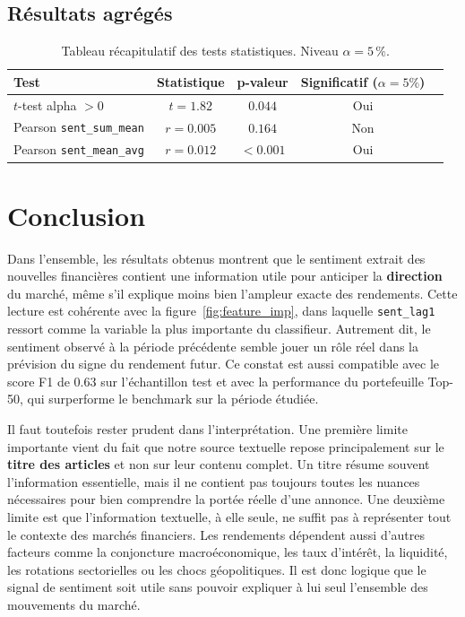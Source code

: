 \documentclass[11pt,a4paper]{article}
\begin{document}
\subsection{Résultats agrégés}

\begin{table}[H]
\centering
\small
\begin{tabular}{lcccc}
\toprule
\textbf{Test} & \textbf{Statistique} & \textbf{p-valeur} & \textbf{Significatif ($\alpha=5\%$)} \\
\midrule
$t$-test alpha $> 0$           & $t = 1.82$   & $0.044$ & Oui \\
Pearson \texttt{sent\_sum\_mean} & $r = 0.005$   & $0.164$ & Non \\
Pearson \texttt{sent\_mean\_avg} & $r = 0.012$   & $<0.001$ & Oui \\
\bottomrule
\end{tabular}
\caption{Tableau récapitulatif des tests statistiques. Niveau $\alpha = 5\,\%$.}
\label{tab:hyp_tests}
\end{table}

\section{Conclusion}

Dans l'ensemble, les résultats obtenus montrent que le sentiment extrait des nouvelles financières contient une information utile pour anticiper la \textbf{direction} du marché, même s'il explique moins bien l'ampleur exacte des rendements. Cette lecture est cohérente avec la figure~\ref{fig:feature_imp}, dans laquelle \texttt{sent\_lag1} ressort comme la variable la plus importante du classifieur. Autrement dit, le sentiment observé à la période précédente semble jouer un rôle réel dans la prévision du signe du rendement futur. Ce constat est aussi compatible avec le score F1 de $0.63$ sur l'échantillon test et avec la performance du portefeuille Top-50, qui surperforme le benchmark sur la période étudiée.

Il faut toutefois rester prudent dans l'interprétation. Une première limite importante vient du fait que notre source textuelle repose principalement sur le \textbf{titre des articles} et non sur leur contenu complet. Un titre résume souvent l'information essentielle, mais il ne contient pas toujours toutes les nuances nécessaires pour bien comprendre la portée réelle d'une annonce. Une deuxième limite est que l'information textuelle, à elle seule, ne suffit pas à représenter tout le contexte des marchés financiers. Les rendements dépendent aussi d'autres facteurs comme la conjoncture macroéconomique, les taux d'intérêt, la liquidité, les rotations sectorielles ou les chocs géopolitiques. Il est donc logique que le signal de sentiment soit utile sans pouvoir expliquer à lui seul l'ensemble des mouvements du marché.
\end{document}
